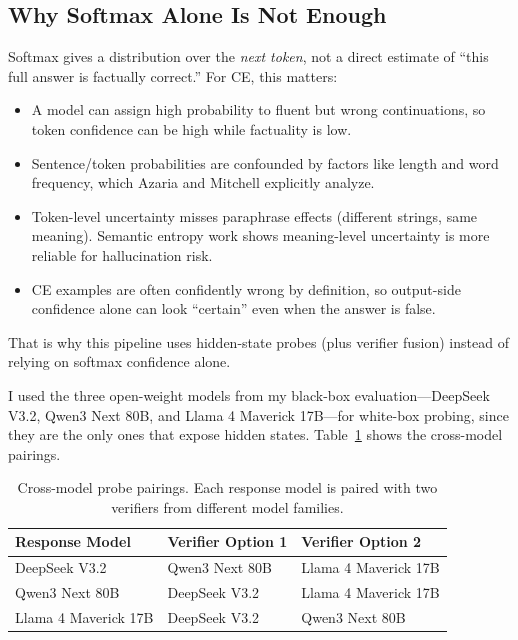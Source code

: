 \documentclass[11pt]{article}
\begin{document}
\subsection{Why Softmax Alone Is Not Enough}

Softmax gives a distribution over the \emph{next token}, not a direct estimate of ``this full answer is factually correct.'' For CE, this matters:
\begin{itemize}
    \item A model can assign high probability to fluent but wrong continuations, so token confidence can be high while factuality is low.
    \item Sentence/token probabilities are confounded by factors like length and word frequency, which Azaria and Mitchell explicitly analyze.
    \item Token-level uncertainty misses paraphrase effects (different strings, same meaning). Semantic entropy work shows meaning-level uncertainty is more reliable for hallucination risk.
    \item CE examples are often confidently wrong by definition, so output-side confidence alone can look ``certain'' even when the answer is false.
\end{itemize}

That is why this pipeline uses hidden-state probes (plus verifier fusion) instead of relying on softmax confidence alone.

I used the three open-weight models from my black-box evaluation---DeepSeek V3.2, Qwen3 Next 80B, and Llama 4 Maverick 17B---for white-box probing, since they are the only ones that expose hidden states. Table~\ref{tab:pairings} shows the cross-model pairings.

\begin{table}[H]
\centering
\begin{tabular}{lll}
\toprule
\textbf{Response Model} & \textbf{Verifier Option 1} & \textbf{Verifier Option 2} \\
\midrule
DeepSeek V3.2 & Qwen3 Next 80B & Llama 4 Maverick 17B \\
Qwen3 Next 80B & DeepSeek V3.2 & Llama 4 Maverick 17B \\
Llama 4 Maverick 17B & DeepSeek V3.2 & Qwen3 Next 80B \\
\bottomrule
\end{tabular}
\caption{Cross-model probe pairings. Each response model is paired with two verifiers from different model families.}
\label{tab:pairings}
\end{table}
\end{document}
